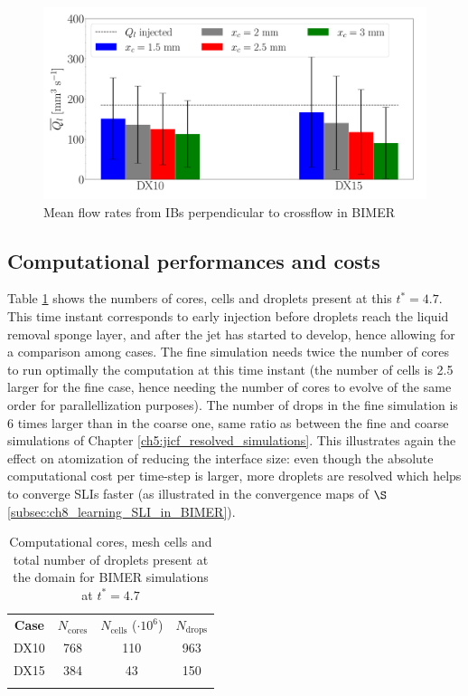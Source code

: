 \begin{figure}[ht]
\centering
   \includegraphics[scale=0.25]{./part3_applications/figures_ch8_resolved/flow_rates_ibs/bar_graph_isox_IBs}
   \vspace*{-0.2in}
\caption{Mean flow rates from IBs perpendicular to crossflow in BIMER}
\label{fig:BIMER_IB_bargraph_mean}
\end{figure}


\vspace*{-0.2in}

\subsection{Computational performances and costs}


Table \ref{tab:BIMER_Ncores_Ncells_Ndrops} shows the numbers of cores, cells and droplets present at this $t^* = 4.7$. This time instant corresponds to early injection before droplets reach the liquid removal sponge layer, and after the jet has started to develop, hence allowing for a comparison among cases. The fine simulation needs twice the number of cores to run optimally the computation at this time instant (the number of cells is 2.5 larger for the fine case, hence needing the number of cores to evolve of the same order for parallellization purposes). The number of drops in the fine simulation is 6 times larger than in the coarse one, same ratio as between the fine and coarse simulations of Chapter \ref{ch5:jicf_resolved_simulations}. This illustrates again the effect on atomization of reducing the interface size: even though the absolute computational cost per time-step is larger, more droplets are resolved which helps to converge SLIs faster (as illustrated in the convergence maps of $\S$\ref{subsec:ch8_learning_SLI_in_BIMER}). 

\begin{table}[!h]
\centering
\caption{Computational cores, mesh cells and total number of droplets present at the domain for BIMER simulations at $t^* = 4.7$}
\vspace{-0.1in}
\begin{tabular}{cccc}
\thickhline
\textbf{Case} &  $N_\mathrm{cores}$ & $N_\mathrm{cells}$ ($\cdot 10^6$) & $N_\mathrm{drops}$\\
\thickhline 
DX10 & 768  & 110 & 963 \\ %
DX15 & 384 & 43 & 150  \\ %
\thickhline
\end{tabular}
\label{tab:BIMER_Ncores_Ncells_Ndrops}
\end{table}

